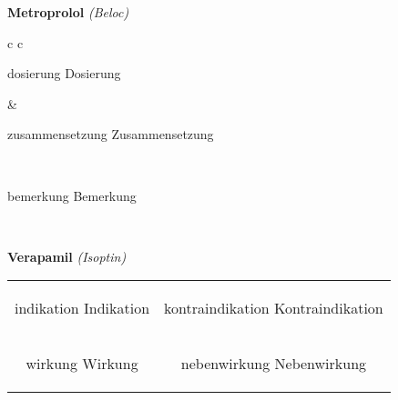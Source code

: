 \documentclass[12pt]{beamer}
\begin{document}
\begin{frame}{
    \textbf{Metroprolol}
    \textit{(Beloc)}
}
    \begin{tabular}{c c}
        \begin{beamercolorbox}[wd=\boxwidth\textwidth,ht=\boxheight\textheight,sep=1em]{dosierung}
        Dosierung
        \end{beamercolorbox} & 
        \begin{beamercolorbox}[wd=\boxwidth\textwidth,ht=\boxheight\textheight,sep=1em]{zusammensetzung}
        Zusammensetzung
        \end{beamercolorbox} \\
        \begin{beamercolorbox}[wd=\textwidth,ht=\boxheight\textheight,sep=1em]{bemerkung}
        Bemerkung
        \end{beamercolorbox} \\
    \end{tabular}
\end{frame}

\begin{frame}{
    \textbf{Verapamil}
    \textit{(Isoptin)}
}
    \begin{tabular}{c c}
        \begin{beamercolorbox}[wd=\boxwidth\textwidth,ht=\boxheight\textheight,sep=1em]{indikation}
        Indikation
        \end{beamercolorbox} & 
        \begin{beamercolorbox}[wd=\boxwidth\textwidth,ht=\boxheight\textheight,sep=1em]{kontraindikation}
        Kontraindikation 
        \end{beamercolorbox} \\
        \begin{beamercolorbox}[wd=\boxwidth\textwidth,ht=\boxheight\textheight,sep=1em]{wirkung}
        Wirkung
        \end{beamercolorbox} & 
        \begin{beamercolorbox}[wd=\boxwidth\textwidth,ht=\boxheight\textheight,sep=1em]{nebenwirkung}
        Nebenwirkung
        \end{beamercolorbox} \\
    \end{tabular}
\end{frame}
\end{document}
